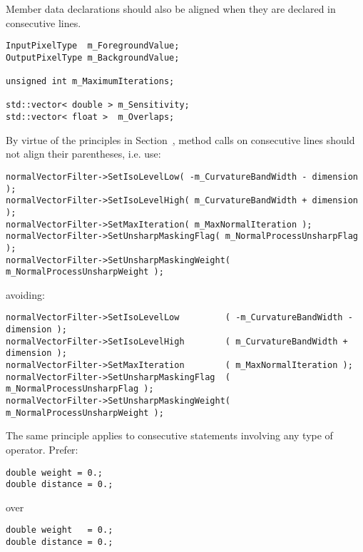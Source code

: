 Member data declarations should also be aligned when they are declared in consecutive lines.

\small
\begin{verbatim}
InputPixelType  m_ForegroundValue;
OutputPixelType m_BackgroundValue;

unsigned int m_MaximumIterations;

std::vector< double > m_Sensitivity;
std::vector< float >  m_Overlaps;
\end{verbatim}
\normalsize

By virtue of the principles in Section~\href{subsec:WhiteSpaces}, method calls
on consecutive lines should not align their parentheses, i.e. use:

\small
\begin{verbatim}
normalVectorFilter->SetIsoLevelLow( -m_CurvatureBandWidth - dimension );
normalVectorFilter->SetIsoLevelHigh( m_CurvatureBandWidth + dimension );
normalVectorFilter->SetMaxIteration( m_MaxNormalIteration );
normalVectorFilter->SetUnsharpMaskingFlag( m_NormalProcessUnsharpFlag );
normalVectorFilter->SetUnsharpMaskingWeight( m_NormalProcessUnsharpWeight );
\end{verbatim}
\normalsize

avoiding:

\small
\begin{verbatim}
normalVectorFilter->SetIsoLevelLow         ( -m_CurvatureBandWidth - dimension );
normalVectorFilter->SetIsoLevelHigh        ( m_CurvatureBandWidth + dimension );
normalVectorFilter->SetMaxIteration        ( m_MaxNormalIteration );
normalVectorFilter->SetUnsharpMaskingFlag  ( m_NormalProcessUnsharpFlag );
normalVectorFilter->SetUnsharpMaskingWeight( m_NormalProcessUnsharpWeight );
\end{verbatim}
\normalsize

The same principle applies to consecutive statements involving any type of
operator. Prefer:

\small
\begin{verbatim}
double weight = 0.;
double distance = 0.;
\end{verbatim}
\normalsize

over

\small
\begin{verbatim}
double weight   = 0.;
double distance = 0.;
\end{verbatim}
\normalsize

